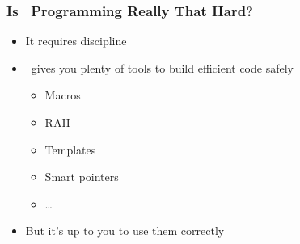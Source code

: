 \begin{frame}
  \frametitle{Is \cpp\ Programming Really That Hard?}
  \begin{itemize}
    \item It requires discipline
    \item \cpp\ gives you plenty of tools to build efficient code safely
          \begin{itemize}
            \item Macros
            \item RAII
            \item Templates
            \item Smart pointers
            \item \dots
          \end{itemize}
    \item But it's up to you to use them correctly
  \end{itemize}
\end{frame}


